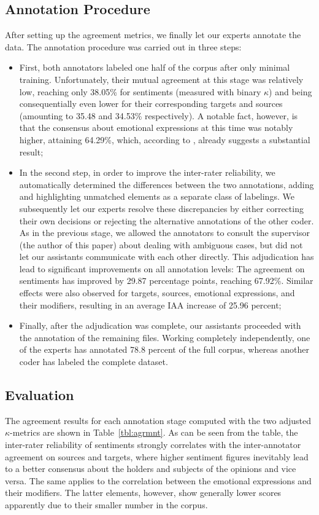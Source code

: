 \subsection{Annotation Procedure}\label{sec:astages}
After setting up the agreement metrics, we finally let our experts
annotate the data.  The annotation procedure was carried out in three
steps:
\begin{itemize}
  \item First, both annotators labeled one half of the corpus after
    only minimal training.  Unfortunately, their mutual agreement at
    this stage was relatively low, reaching only 38.05\% for
    sentiments (measured with binary $\kappa$) and being
    consequentially even lower for their corresponding targets and
    sources (amounting to 35.48 and 34.53\% respectively).  A notable
    fact, however, is that the consensus about emotional expressions
    at this time was notably higher, attaining 64.29\%, which,
    according to \citet{Landis:77}, already suggests a substantial
    result;
  \item In the second step, in order to improve the inter-rater
    reliability, we automatically determined the differences between
    the two annotations, adding and highlighting unmatched elements as
    a separate class of labelings. We subsequently let our experts
    resolve these discrepancies by either correcting their own
    decisions or rejecting the alternative annotations of the other
    coder.  As in the previous stage, we allowed the annotators to
    consult the supervisor (the author of this paper) about dealing
    with ambiguous cases, but did not let our assistants communicate
    with each other directly.  This adjudication has lead to
    significant improvements on all annotation levels: The agreement
    on sentiments has improved by 29.87 percentage points, reaching
    67.92\%.  Similar effects were also observed for targets, sources,
    emotional expressions, and their modifiers, resulting in an
    average IAA increase of 25.96 percent;
  \item Finally, after the adjudication was complete, our assistants
    proceeded with the annotation of the remaining files.  Working
    completely independently, one of the experts has annotated 78.8
    percent of the full corpus, whereas another coder has labeled the
    complete dataset.
\end{itemize}

\subsection{Evaluation}\label{sec:eval}
The agreement results for each annotation stage computed with the two
adjusted $\kappa$-metrics are shown in Table~\ref{tbl:agrmnt}.  As can
be seen from the table, the inter-rater reliability of sentiments
strongly correlates with the inter-annotator agreement on sources and
targets, where higher sentiment figures inevitably lead to a better
consensus about the holders and subjects of the opinions and vice
versa.  The same applies to the correlation between the emotional
expressions and their modifiers. The latter elements, however, show
generally lower scores apparently due to their smaller number in the
corpus.

